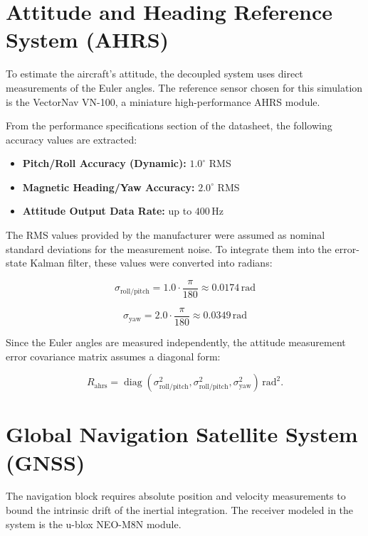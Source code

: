 \documentclass[a4paper,twoside,openany]{report}
\begin{document}
\section{Attitude and Heading Reference System (AHRS)}

To estimate the aircraft's attitude, the decoupled system uses direct measurements of the Euler angles. The reference sensor chosen for this simulation is the VectorNav VN-100, a miniature high-performance AHRS module.

From the performance specifications section of the datasheet, the following accuracy values are extracted:

\begin{itemize}
    \item \textbf{Pitch/Roll Accuracy (Dynamic):} $1.0^\circ$ RMS
    \item \textbf{Magnetic Heading/Yaw Accuracy:} $2.0^\circ$ RMS
    \item \textbf{Attitude Output Data Rate:} up to $400\,\mathrm{Hz}$
\end{itemize}

The RMS values provided by the manufacturer were assumed as nominal standard deviations for the measurement noise. To integrate them into the error-state Kalman filter, these values were converted into radians:

\begin{equation}
    \sigma_{\mathrm{roll/pitch}} = 1.0 \cdot \frac{\pi}{180} \approx 0.0174\,\mathrm{rad}
\end{equation}

\begin{equation}
    \sigma_{\mathrm{yaw}} = 2.0 \cdot \frac{\pi}{180} \approx 0.0349\,\mathrm{rad}
\end{equation}

Since the Euler angles are measured independently, the attitude measurement error covariance matrix assumes a diagonal form:

\begin{equation}
    R_{\mathrm{ahrs}} = \operatorname{diag}(\sigma_{\mathrm{roll/pitch}}^2,\sigma_{\mathrm{roll/pitch}}^2,\sigma_{\mathrm{yaw}}^2)\,\mathrm{rad^2}.
\end{equation}

\section{Global Navigation Satellite System (GNSS)}

The navigation block requires absolute position and velocity measurements to bound the intrinsic drift of the inertial integration. The receiver modeled in the system is the u-blox NEO-M8N module.
\end{document}
